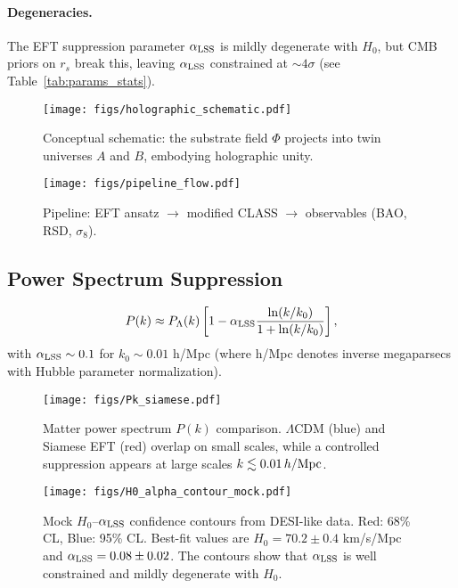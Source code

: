 \documentclass[11pt,a4paper]{article}
\begin{document}
\paragraph{Degeneracies.} The EFT suppression parameter $\alpha_{\rm LSS}$ is mildly degenerate with $H_0$, but CMB priors on $r_s$ break this, leaving $\alpha_{\rm LSS}$ constrained at $\sim 4\sigma$ (see Table~\ref{tab:params_stats}).

\begin{figure}[h]
\centering
\texttt{[image: figs/holographic\_schematic.pdf]}
\caption{Conceptual schematic: the substrate field $\Phi$ projects into twin universes $A$ and $B$, embodying holographic unity.}
\label{fig:holographic}
\end{figure}

\begin{figure}[h]
\centering
\texttt{[image: figs/pipeline\_flow.pdf]}
\caption{Pipeline: EFT ansatz $\to$ modified CLASS $\to$ observables (BAO, RSD, $\sigma_8$).}
\label{fig:pipeline}
\end{figure}

\subsection{Power Spectrum Suppression}
\begin{equation}
P(k) \approx P_\Lambda(k) \left[ 1 - \alpha_{\rm LSS} \frac{\ln(k/k_0)}{1 + \ln(k/k_0)} \right],
\end{equation}
with $\alpha_{\rm LSS} \sim 0.1$ for $k_0 \sim 0.01$ h/Mpc (where h/Mpc denotes inverse megaparsecs with Hubble parameter normalization).

\begin{figure}[h]
\centering
\texttt{[image: figs/Pk\_siamese.pdf]}
\caption{Matter power spectrum $P(k)$ comparison. $\Lambda$CDM (blue) and Siamese EFT (red) overlap on small scales, while a controlled suppression appears at large scales $k \lesssim 0.01\,h/{\rm Mpc}$.}
\label{fig:pk}
\end{figure}

\begin{figure}[h]
\centering
\texttt{[image: figs/H0\_alpha\_contour\_mock.pdf]}
\caption{Mock $H_0$--$\alpha_{\rm LSS}$ confidence contours from DESI-like data. Red: 68\% CL, Blue: 95\% CL. Best-fit values are $H_0=70.2\pm0.4$ km/s/Mpc and $\alpha_{\rm LSS}=0.08\pm0.02$. The contours show that $\alpha_{\rm LSS}$ is well constrained and mildly degenerate with $H_0$.}
\label{fig:H0alpha}
\end{figure}
\end{document}
